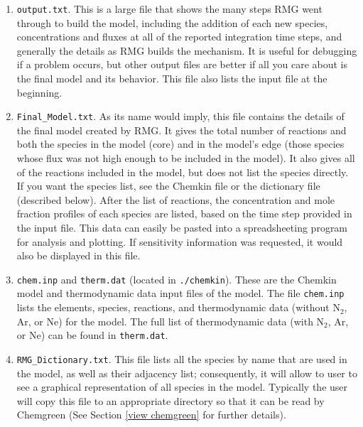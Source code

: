 \documentclass[12pt,letterpaper]{article}
\begin{document}
\begin{enumerate}
\item \texttt{output.txt}.  This is a large file that shows the many steps RMG went
through to build the model, including the addition of each new species,
concentrations and fluxes at all of the reported integration time steps, and generally the details as RMG builds the mechanism. It is useful
for debugging if a problem occurs, but other output files are better if
all you care about is the final model and its behavior. This file also
lists the input file at the beginning.\\

\item  \texttt{Final\_Model.txt}.  As its name would imply, this file contains the details of
the final model created by RMG. It gives the total number of reactions
and both the species in the model (core) and in the model's edge (those species
whose flux was not high enough to be included in the model). It also
gives all of the reactions included in the model, but does not list the
species directly. If you want the species list, see the Chemkin file or
the dictionary file (described below). After the list of reactions, the concentration
and mole fraction profiles of each species are listed, based on
the time step provided in the input file. This data can easily be pasted
into a spreadsheeting program for analysis and plotting. If sensitivity
information was requested, it would also be displayed in this file.\\

\item \texttt{chem.inp} and \texttt{therm.dat} (located in \texttt{./chemkin}).  These are the Chemkin model and thermodynamic data input files
of the model. The file \texttt{chem.inp} lists the elements, species, reactions,
and thermodynamic data (without N$_2$, Ar, or Ne) for the model. The
full list of thermodynamic data (with N$_2$, Ar, or Ne) can be found in
\texttt{therm.dat}.\\

\item \texttt{RMG\_Dictionary.txt}.  This file lists all the species by name
that are used in the model, as well as their adjacency list;  consequently, it will allow to user to see a graphical representation of all species in the model. Typically the user will copy this file to an appropriate directory so that it can be read by Chemgreen (See Section \ref{view chemgreen} for further details).\\


\end{enumerate}
\end{document}
